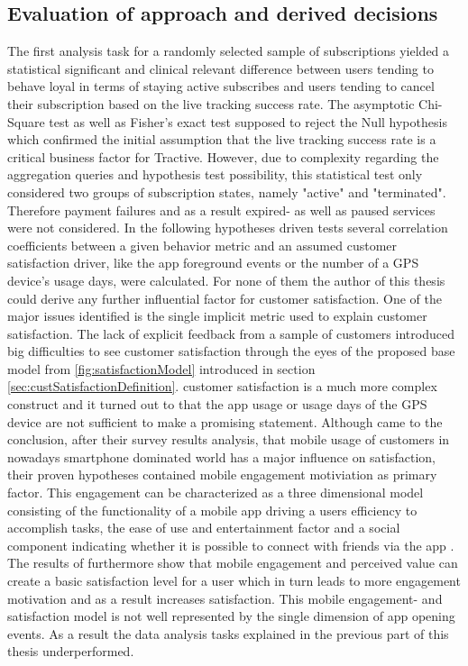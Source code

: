 \subsection{Evaluation of approach and derived decisions}
The first analysis task for a randomly selected sample of subscriptions yielded a statistical significant and clinical relevant difference between users tending to behave loyal in terms of staying active subscribes and users tending to cancel their subscription based on the live tracking success rate. The asymptotic Chi-Square test as well as Fisher's exact test supposed to reject the Null hypothesis which confirmed the initial assumption that the live tracking success rate is a critical business factor for Tractive. However, due to complexity regarding the aggregation queries and hypothesis test possibility, this statistical test only considered two groups of subscription states, namely "active" and "terminated". Therefore payment failures and as a result expired- as well as paused services were not considered. In the following hypotheses driven tests several correlation coefficients between a given behavior metric and an assumed customer satisfaction driver, like the app foreground events or the number of a GPS device's usage days, were calculated. For none of them the author of this thesis could derive any further influential factor for customer satisfaction. One of the major issues identified is the single implicit metric used to explain customer satisfaction. The lack of explicit feedback from a sample of customers introduced big difficulties to see customer satisfaction through the eyes of the proposed base model from \ref{fig:satisfactionModel} introduced in section \ref{sec:custSatisfactionDefinition}. customer satisfaction is a much more complex construct and it turned out to that the app usage or usage days of the GPS device are not sufficient to make a promising statement. Although \cite{kim2013study} came to the conclusion, after their survey results analysis, that mobile usage of customers in nowadays smartphone dominated world has a major influence on satisfaction, their proven hypotheses contained mobile engagement motiviation as primary factor. This engagement can be characterized as a three dimensional model consisting of the functionality of a mobile app driving a users efficiency to accomplish tasks, the ease of use and entertainment factor and a social component indicating whether it is possible to connect with friends via the app \cite{VARNALI2010144}. The results of \cite{kim2013study} furthermore show that mobile engagement and perceived value can create a basic satisfaction level for a user which in turn leads to more engagement motivation and as a result increases satisfaction. This mobile engagement- and satisfaction model is not well represented by the single dimension of app opening events. As a result the data analysis tasks explained in the previous part of this thesis underperformed.

